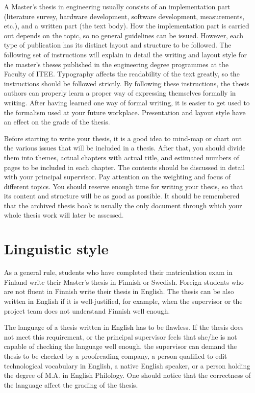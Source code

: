 A Master’s thesis in engineering usually consists of an
implementation part (literature survey, hardware development,
software development, measurements, etc.), and a written part (the
text body). How the implementation part is carried out depends on the
topic, so no general guidelines can be issued. However, each type of
publication has its distinct layout and structure to be followed. The
following set of instructions will explain in detail the writing and
layout style for the master’s theses published in the engineering
degree programmes at the Faculty of ITEE. Typography affects the
readability of the text greatly, so the instructions should be
followed strictly. By following these instructions, the thesis
authors can properly learn a proper way of expressing themselves
formally in writing. After having learned one way of formal writing,
it is easier to get used to the formalism used at your future
workplace. Presentation and layout style have an effect on the grade
of the thesis.

Before starting to write your thesis, it is a good idea to mind-map
or chart out the various issues that will be included in a thesis.
After that, you should divide them into themes, actual chapters with
actual title, and estimated numbers of pages to be included in each
chapter. The contents should be discussed in detail with your
principal supervisor. Pay attention on the weighting and focus of
different topics. You should reserve enough time for writing your
thesis, so that its content and structure will be as good as
possible. It should be remembered that the archived thesis book is
usually the only document through which your whole thesis work will
later be assessed.

\section{Linguistic style}
\label{sec:linguistic_style}

As a general rule, students who have completed their matriculation
exam in Finland write their Master’s thesis in Finnish or Swedish.
Foreign students who are not fluent in Finnish write their thesis in
English. The thesis can be also written in English if it is
well-justified, for example, when the supervisor or the project team
does not understand Finnish well enough.

The language of a thesis written in English has to be flawless. If
the thesis does not meet this requirement, or the principal
supervisor feels that she/he is not capable of checking the language
well enough, the supervisor can demand the thesis to be checked by a
proofreading company, a person qualified to edit technological
vocabulary in English, a native English speaker, or a person holding
the degree of M.A. in English Philology. One should notice that the
correctness of the language affect the grading of the thesis.

